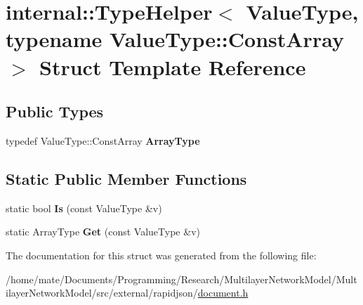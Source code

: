 \hypertarget{structinternal_1_1TypeHelper_3_01ValueType_00_01typename_01ValueType_1_1ConstArray_01_4}{}\section{internal\+:\+:Type\+Helper$<$ Value\+Type, typename Value\+Type\+:\+:Const\+Array $>$ Struct Template Reference}
\label{structinternal_1_1TypeHelper_3_01ValueType_00_01typename_01ValueType_1_1ConstArray_01_4}
\subsection*{Public Types}
\begin{DoxyCompactItemize}
\item 
typedef Value\+Type\+::\+Const\+Array {\bfseries Array\+Type}\hypertarget{structinternal_1_1TypeHelper_3_01ValueType_00_01typename_01ValueType_1_1ConstArray_01_4_a88c3a7bbff09fdd44ce6980f8122ba05}{}\label{structinternal_1_1TypeHelper_3_01ValueType_00_01typename_01ValueType_1_1ConstArray_01_4_a88c3a7bbff09fdd44ce6980f8122ba05}

\end{DoxyCompactItemize}
\subsection*{Static Public Member Functions}
\begin{DoxyCompactItemize}
\item 
static bool {\bfseries Is} (const Value\+Type \&v)\hypertarget{structinternal_1_1TypeHelper_3_01ValueType_00_01typename_01ValueType_1_1ConstArray_01_4_a259497292f89c58789b1e947249dd299}{}\label{structinternal_1_1TypeHelper_3_01ValueType_00_01typename_01ValueType_1_1ConstArray_01_4_a259497292f89c58789b1e947249dd299}

\item 
static Array\+Type {\bfseries Get} (const Value\+Type \&v)\hypertarget{structinternal_1_1TypeHelper_3_01ValueType_00_01typename_01ValueType_1_1ConstArray_01_4_a247811db25d6f25cc63175e03d847b8b}{}\label{structinternal_1_1TypeHelper_3_01ValueType_00_01typename_01ValueType_1_1ConstArray_01_4_a247811db25d6f25cc63175e03d847b8b}

\end{DoxyCompactItemize}


The documentation for this struct was generated from the following file\+:\begin{DoxyCompactItemize}
\item 
/home/mate/\+Documents/\+Programming/\+Research/\+Multilayer\+Network\+Model/\+Multilayer\+Network\+Model/src/external/rapidjson/\hyperlink{document_8h}{document.\+h}\end{DoxyCompactItemize}

